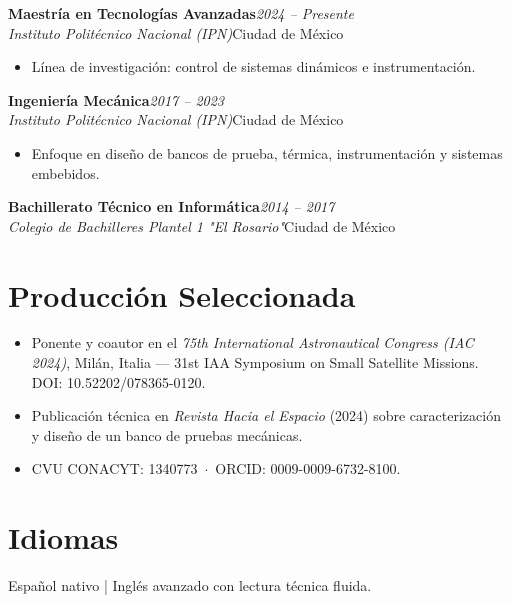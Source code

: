 \documentclass[10pt,a4paper]{article}
\newcommand{\resumeItem}[1]{\item\small #1}
\newcommand{\resumeSubheading}[4]{%
  \vspace{3pt}\noindent
  \textbf{#1}\hfill{\small\textit{\color{graytext}#2}}\\
  \textit{\color{graytext}#3}\hfill{\small\color{graytext}#4}\vspace{2pt}
}
\newcommand{\resumeItemListStart}{\begin{itemize}[leftmargin=1.15em,itemsep=1pt,topsep=2pt,partopsep=0pt,parsep=0pt]}
\newcommand{\resumeItemListEnd}{\end{itemize}\vspace{2pt}}
\begin{document}
\resumeSubheading
{Maestr\'ia en Tecnolog\'ias Avanzadas}{2024 -- Presente}
{Instituto Polit\'ecnico Nacional (IPN)}{Ciudad de M\'exico}
\resumeItemListStart
  \resumeItem{L\'inea de investigaci\'on: control de sistemas din\'amicos e instrumentaci\'on.}
\resumeItemListEnd

\resumeSubheading
{Ingenier\'ia Mec\'anica}{2017 -- 2023}
{Instituto Polit\'ecnico Nacional (IPN)}{Ciudad de M\'exico}
\resumeItemListStart
  \resumeItem{Enfoque en dise\~no de bancos de prueba, t\'ermica, instrumentaci\'on y sistemas embebidos.}
\resumeItemListEnd

\resumeSubheading
{Bachillerato T\'ecnico en Inform\'atica}{2014 -- 2017}
{Colegio de Bachilleres Plantel 1 "El Rosario"}{Ciudad de M\'exico}

\vspace{4pt}
\section{Producci\'on Seleccionada}
\small
\begin{itemize}[leftmargin=1.15em,itemsep=2pt,topsep=3pt,partopsep=0pt,parsep=0pt]
  \item Ponente y coautor en el \textit{75th International Astronautical Congress (IAC 2024)}, Mil\'an, Italia — 31st IAA Symposium on Small Satellite Missions. DOI: 10.52202/078365-0120.
  \item Publicaci\'on t\'ecnica en \textit{Revista Hacia el Espacio} (2024) sobre caracterizaci\'on y dise\~no de un banco de pruebas mec\'anicas.
  \item CVU CONACYT: 1340773 \,$\cdot$\, ORCID: 0009-0009-6732-8100.
\end{itemize}

\section{Idiomas}
\small
Espa\~nol nativo | Ingl\'es avanzado con lectura t\'ecnica fluida.
\end{document}
